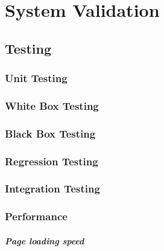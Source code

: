 \chapter{System Validation}

\section{Testing}
	\subsection{Unit Testing}


	\subsection{White Box Testing}
	\subsection{Black Box Testing}

	\subsection{Regression Testing}

	\subsection{Integration Testing}

	\subsection{Performance}
	\paragraph{Page loading speed}
